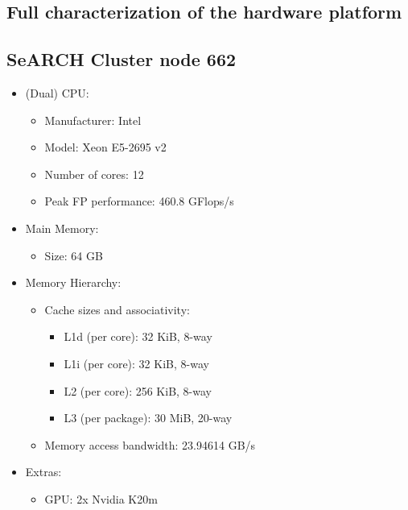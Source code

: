 \documentclass{article}
\begin{document}
\newpage 
\begin{appendices}

\section{Full characterization of the hardware platform}

\subsection{SeARCH Cluster node 662}
\label{node662_hardware_desc}
\begin{itemize}
    \item (Dual) CPU:
        \begin{itemize}
            \item Manufacturer: Intel
            \item Model: Xeon E5-2695 v2 
            \item Number of cores: 12
            \item Peak FP performance: 460.8 GFlops/s ~\cite{flops, flopsCalc}
        \end{itemize}
    \item Main Memory:
        \begin{itemize}
            \item Size: 64 GB
        \end{itemize}
    \item Memory Hierarchy:
        \begin{itemize}
            \item Cache sizes and associativity:
                \begin{itemize}
                    \item L1d (per core): 32 KiB, 8-way
                    \item L1i (per core): 32 KiB, 8-way
                    \item L2 (per core): 256 KiB, 8-way
                    \item L3 (per package): 30 MiB, 20-way
                \end{itemize}
            \item Memory access bandwidth: 23.94614 GB/s
        \end{itemize}
    \item Extras:
        \begin{itemize}
            \item GPU: 2x Nvidia K20m \cite{GPU,K20,GK110}
            \begin{itemize}

\end{itemize}
\end{itemize}
\end{itemize}
\end{appendices}
\end{document}
